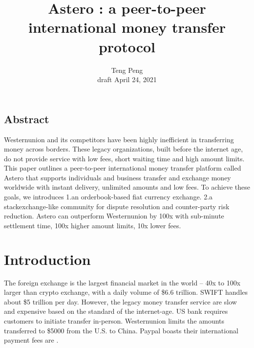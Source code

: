 \documentclass[letterpaper,twocolumn,10pt]{article}
\begin{document}
\date{}

\title{\Large \bf Astero : a peer-to-peer international money transfer protocol}

\author{
{\rm Teng Peng}\\
draft April 24, 2021
}

\maketitle

\thispagestyle{empty}


\subsection*{Abstract}
Westernunion and its competitors have been highly inefficient in transferring money across borders. These legacy organizations, built before the internet age, do not provide service with low fees, short waiting time and high amount limits. This paper outlines a peer-to-peer international money transfer platform called Astero that supports individuals and business transfer and exchange money worldwide with instant delivery, unlimited amounts and low fees. To achieve these goals, we introduces 1.an orderbook-based fiat currency exchange. 2.a stackexchange-like community for dispute resolution and counter-party risk reduction. Astero can outperform Westernunion by 100x with sub-minute settlement time, 100x higher amount limits, 10x lower fees.

\section{Introduction}

The foreign exchange is the largest financial market in the world – 40x to 100x larger than crypto exchange, with a daily volume of \$6.6 trillion. SWIFT handles about \$5 trillion per day. However, the legacy money transfer service are slow and expensive based on the standard of the internet-age. US bank requires customers to initiate transfer in-person. Westernunion limits the amounts transferred to \$5000 from the U.S. to China. Paypal boasts their international payment fees are .  
\end{document}
